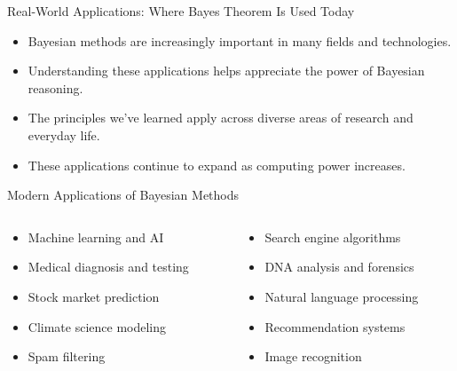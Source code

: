 \documentclass{beamer}
\begin{document}
	\begin{frame}{Real-World Applications: Where Bayes Theorem Is Used Today}
		\begin{itemize}
			\item Bayesian methods are increasingly important in many fields and technologies.
			\item Understanding these applications helps appreciate the power of Bayesian reasoning.
			\item The principles we've learned apply across diverse areas of research and everyday life.
			\item These applications continue to expand as computing power increases.
		\end{itemize}
		
		\begin{block}{Modern Applications of Bayesian Methods}
			\begin{columns}
				\scriptsize
				\begin{column}{0.48\textwidth}
					\begin{itemize}
						\item Machine learning and AI
						\item Medical diagnosis and testing
						\item Stock market prediction
						\item Climate science modeling
						\item Spam filtering
					\end{itemize}
				\end{column}
				\begin{column}{0.48\textwidth}
					\begin{itemize}
						\item Search engine algorithms
						\item DNA analysis and forensics
						\item Natural language processing
						\item Recommendation systems
						\item Image recognition
					\end{itemize}
				\end{column}
			\end{columns}
		\end{block}
	\end{frame}
	
\end{document}
